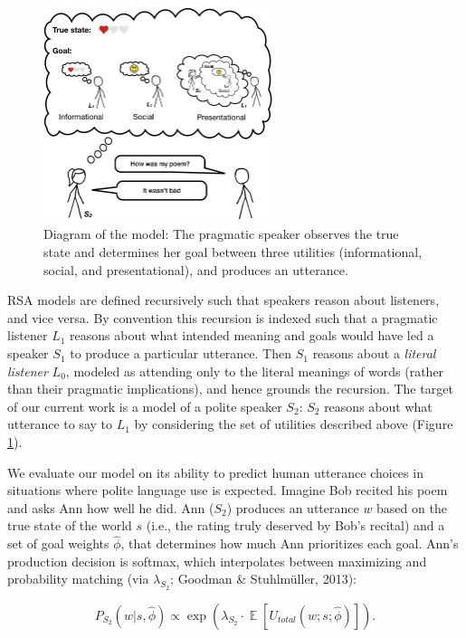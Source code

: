 \documentclass[9pt,twocolumn,twoside,lineno]{main_class_file}
\begin{document}
\begin{figure}[!h]
\includegraphics[width=0.6\textwidth]{fig/model} \centering \caption{Diagram of the model: The pragmatic speaker observes the true state and determines her goal between three utilities (informational, social, and presentational), and produces an utterance.}\label{fig:model}
\end{figure}

RSA models are defined recursively such that speakers reason about
listeners, and vice versa. By convention this recursion is indexed such
that a pragmatic listener \(L_1\) reasons about what intended meaning
and goals would have led a speaker \(S_1\) to produce a particular
utterance. Then \(S_1\) reasons about a \emph{literal listener}
\(L_0\), modeled as attending only to the literal meanings of words
(rather than their pragmatic implications), and hence grounds the
recursion. The target of our current work is a model of a polite speaker
\(S_2\): \(S_2\) reasons about what utterance to say to \(L_1\) by
considering the set of utilities described above (Figure
\ref{fig:model}).

We evaluate our model on its ability to predict human utterance choices
in situations where polite language use is expected. Imagine Bob recited
his poem and asks Ann how well he did. Ann (\(S_2\)) produces an
utterance \(w\) based on the true state of the world \(s\) (i.e., the
rating truly deserved by Bob's recital) and a set of goal weights
\(\hat{\phi}\), that determines how much Ann prioritizes each goal.
Ann's production decision is softmax, which interpolates between
maximizing and probability matching (via \(\lambda_{S_2}\); Goodman \&
Stuhlmüller, 2013):

\begin{equation}
P_{S_2}(w | s, \hat{\phi}) \propto \exp(\lambda_{S_2} \cdot \mathop{\mathbb{E}}[U_{total}(w; s; \hat{\phi})]).
\end{equation} 
\end{document}
